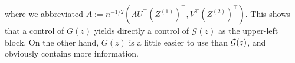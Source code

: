  where we abbreviated $A:= n^{-1/2}(\Lambda U^\top (Z^{(1)})^\top, V^\top (Z^{(2)})^\top)$. 
 This shows that a control of $G(z)$ yields directly a control of $\mathcal G(z)$ as the upper-left block. On the other hand, $G(z)$ is a little  easier to use than $\cal G(z)$, and obviously contains more information.



